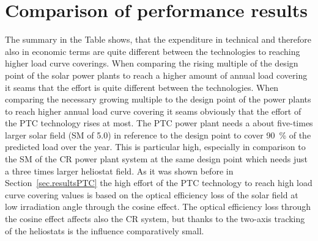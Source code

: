\section{Comparison of performance results}
The summary in the Table shows, that the expenditure in technical and therefore also in economic terms are quite different between the technologies to reaching higher load curve coverings. When comparing the rising multiple of the design point of the solar power plants to reach a higher amount of annual load covering it seams that the effort is quite different between the technologies. When comparing the necessary growing multiple to the design point of the power plants to reach higher annual load curve covering it seams obviously that the effort of the PTC technology rises at most. The PTC power plant needs a about five-times larger solar field (SM of 5.0) in reference to the design point to cover \SI{90}{\percent} of the predicted load over the year. This is particular high, especially in comparison to the SM of the CR power plant system at the same design point which needs just a three times larger heliostat field. As it was shown before in Section~\ref{sec.resultsPTC} the high effort of the PTC technology to reach high load curve covering values is based on the optical efficiency loss of the solar field at low irradiation angle through the cosine effect. The optical efficiency loss through the cosine effect affects also the CR system, but thanks to the two-axis tracking of the heliostats is the influence comparatively small. 

